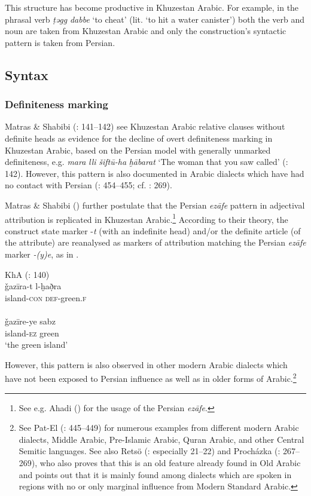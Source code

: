 \documentclass[output=paper,nonflat]{langsci/langscibook}
\begin{document}
This structure has become productive in Khuzestan Arabic. For example, in the phrasal verb \textit{ṭəgg} \textit{dabbe} ‘to cheat’ (lit. ‘to hit a water canister’) both the verb and noun are taken from Khuzestan Arabic and only the construction’s syntactic pattern is taken from Persian. 

\subsection{Syntax}
\subsubsection{Definiteness marking}

Matras \& Shabibi (\citeyear{MatrasShabibi2007}: 141–142) see Khuzestan Arabic relative clauses without definite heads as evidence for the decline of overt definiteness marking in Khuzestan Arabic, based on the Persian model with generally unmarked definiteness, e.g. \textit{mara} \textit{lli} \textit{šiftū-ha} \textit{ḫābarat} ‘The woman that you saw called’ (\citeyear{MatrasShabibi2007}: 142). However, this pattern is also documented in Arabic dialects which have had no contact with Persian (\citealt{Pat-El2017}: 454–455; cf. \citealt{Procházka2018}: 269).

Matras \& Shabibi (\citeyear[140]{MatrasShabibi2007}) further postulate that the Persian \textit{ezāfe} pattern in adjectival attribution is replicated in Khuzestan Arabic.\footnote{See e.g. Ahadi (\citeyear[103–109]{Ahadi2001}) for the usage of the Persian \textit{ezāfe}.} According to their theory, the construct state marker -\textit{t} (with an indefinite head) and/or the definite article (of the attribute) are reanalysed as markers of attribution matching the Persian  \textit{ezāfe} marker \textit{-(y)e}, as in . 

\ea\label{island}
\ea
{KhA (\citealt{MatrasShabibi2007}: 140)}\\
\gll ǧazīra-t l-ḫað̣ra \\
     island-\textsc{con} \textsc{def}-green.\textsc{f}\\
 
\\
\gll ǧazīre-ye sabz\\
     island-\textsc{ez} green\\
\glt ‘the green island’ 
\z\z

However, this pattern is also observed in other modern Arabic dialects which have not been exposed to Persian influence as well as in older forms of Arabic.\footnote{See Pat-El (\citeyear{Pat-El2017}: 445–449) for numerous examples from different modern Arabic dialects, Middle Arabic, Pre-Islamic Arabic, Quran Arabic, and other Central Semitic languages. See also Retsö (\citeyear{Retsö2009}: especially 21–22) and Procházka (\citeyear{Procházka2018}: 267–269), who also proves that this is an old feature already found in Old Arabic and points out that it is mainly found among dialects which are spoken in regions with no or only marginal influence from Modern Standard Arabic.} 
\end{document}
